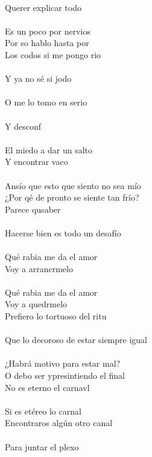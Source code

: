 \begin{cancion}[Arrancármelo][Wos]
	\jump\\
Querer explicar todo\\
	\jump\\
Es un poco por nervios\\
	Por so hablo hasta por\\
	Los codos si me pongo rio\\
	\jump\\
Y ya no sé si jodo\\
	\jump\\
O me lo tomo en serio\\
	\jump\\
	Y desconf\\
	\jump\\
El miedo a dar un salto\\
	Y encontrar vaco\\
	\jump\\
Ansío que esto que siento no sea mío\\
	¿Por qé de pronto se siente tan frío?\\
	Parece qusaber\\
	\jump\\
Hacerse bien es todo un desafío\\
	\jump\\
	 Qué rabia me da el amor\\
	Voy a arrancrmelo\\
	\jump\\
Qué rabia me da el amor\\
	Voy a quedrmelo \\
	Prefiero lo tortuoso del ritu\\
	\jump\\
Que lo decoroso de estar siempre igual\\
	\jump\\
	 ¿Habrá motivo para estar mal?\\
	O debo ser ypresintiendo el final\\
	No es eterno el carnavl\\
	\jump\\
Si es etéreo lo carnal\\
	Encontraros algún otro canal\\
	\jump\\
Para juntar el plexo\\
	\jump\\

\end{cancion}
